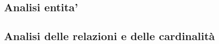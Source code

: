 \subsection{Analisi entita'}\label{analisi_entita}
    
    
\subsection{Analisi delle relazioni e delle cardinalità}
    

    
